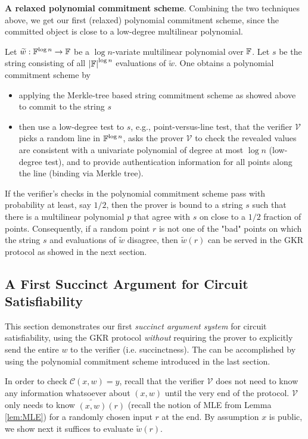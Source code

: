 \documentclass{article}
\begin{document}
\textbf{A relaxed polynomial commitment scheme}. Combining the two techniques above, we get our first (relaxed) polynomial commitment scheme, since the committed object is close to a low-degree multilinear polynomial.

\begin{boxx1}
Let $\widetilde{w}: \mathbb{F}^{\log n} \rightarrow \mathbb{F}$ be a $\log n$-variate multilinear polynomial over $\mathbb{F}$. Let $s$ be the string consisting of all $\abs{\mathbb{F}}^{\log n}$ evaluations of $\widetilde{w}$. One obtains a polynomial commitment scheme by
\begin{itemize}
\item applying the Merkle-tree based string commitment scheme as showed above to commit to the string $s$
\item then use a low-degree test to $s$, e.g., point-versus-line test, that the verifier $\mathcal{V}$ picks a random line in $\mathbb{F}^{\log n}$, asks the prover $\mathcal{V}$ to check the revealed values are consistent with a univariate polynomial of degree at most $\log n$ (low-degree test), and to provide authentication information for all points along the line (binding via Merkle tree).
\end{itemize}
\end{boxx1}

If the verifier's checks in the polynomial commitment scheme pass with probability at least, say $1/2$, then the prover is bound to a string $s$ such that there is a multilinear polynomial $p$ that agree with $s$ on close to a $1/2$ fraction of points. Consequently, if a random point $r$ is not one of the "bad" points on which the string $s$ and evaluations of $\widetilde{w}$ disagree, then $\widetilde{w}(r)$ can be served in the GKR protocol as showed in the next section. 

\subsection{A First Succinct Argument for Circuit Satisfiability}

This section demonstrates our first \textit{succinct argument system} for circuit satisfiability, using the GKR protocol \textit{without} requiring the prover to explicitly send the entire $w$ to the verifier (i.e. succinctness). The can be accomplished by using the polynomial commitment scheme introduced in the last section. 

In order to check $\mathcal{C}(x, w) = y$, recall that the verifier $\mathcal{V}$ does not need to know any information whatsoever about $(x, w)$ until the very end of the protocol. $\mathcal{V}$ only needs to know $\widetilde{(x, w)}(r)$ (recall the notion of MLE from Lemma \ref{lem:MLE}) for a randomly chosen input $r$ at the end. By assumption $x$ is public, we show next it suffices to evaluate $\widetilde{w}(r)$. 
\end{document}
